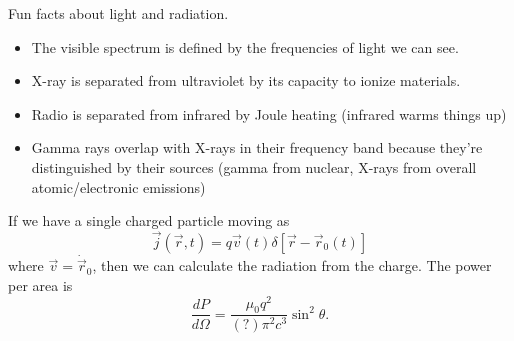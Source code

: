 Fun facts about light and radiation.
\begin{itemize}
    \item The visible spectrum is defined by the frequencies of light we can see.
    \item X-ray is separated from ultraviolet by its capacity to ionize materials.
    \item Radio is separated from infrared by Joule heating (infrared warms things up)
    \item Gamma rays overlap with X-rays in their frequency band because they're distinguished by their sources (gamma from nuclear, X-rays from overall atomic/electronic emissions)
\end{itemize}

If we have a single charged particle moving as
\begin{equation}
    \vec j(\vec r,t) = q\vec v(t) \delta[\vec r- \vec r_0(t)]
\end{equation}
where $\vec v = \dot {\vec r}_0$, then we can calculate the radiation from the charge. The power per area is
\begin{equation}
    \frac{dP}{d\Omega} =\frac{\mu_0 q^2}{(?)\pi^2 c^3}\sin^2\theta.
\end{equation}

